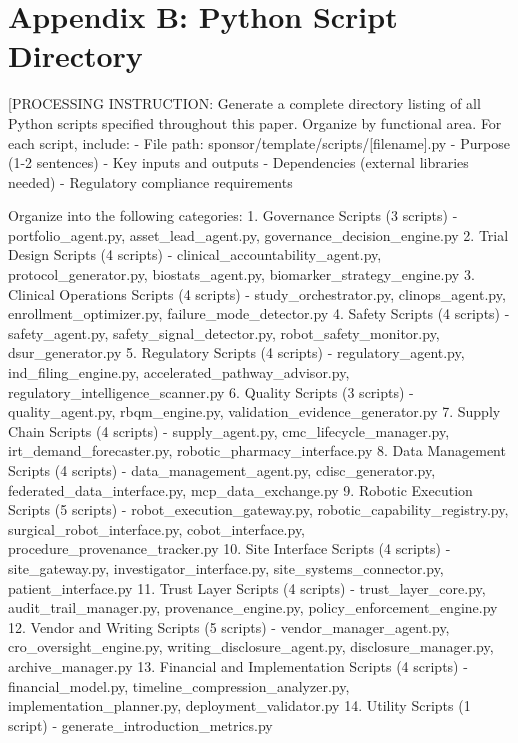 \section*{Appendix B: Python Script Directory}

[PROCESSING INSTRUCTION: Generate a complete directory listing of all Python scripts
specified throughout this paper. Organize by functional area. For each script, include:
- File path: sponsor/template/scripts/[filename].py
- Purpose (1-2 sentences)
- Key inputs and outputs
- Dependencies (external libraries needed)
- Regulatory compliance requirements

Organize into the following categories:
1. Governance Scripts (3 scripts)
   - portfolio\_agent.py, asset\_lead\_agent.py, governance\_decision\_engine.py
2. Trial Design Scripts (4 scripts)
   - clinical\_accountability\_agent.py, protocol\_generator.py, biostats\_agent.py,
     biomarker\_strategy\_engine.py
3. Clinical Operations Scripts (4 scripts)
   - study\_orchestrator.py, clinops\_agent.py, enrollment\_optimizer.py,
     failure\_mode\_detector.py
4. Safety Scripts (4 scripts)
   - safety\_agent.py, safety\_signal\_detector.py, robot\_safety\_monitor.py,
     dsur\_generator.py
5. Regulatory Scripts (4 scripts)
   - regulatory\_agent.py, ind\_filing\_engine.py, accelerated\_pathway\_advisor.py,
     regulatory\_intelligence\_scanner.py
6. Quality Scripts (3 scripts)
   - quality\_agent.py, rbqm\_engine.py, validation\_evidence\_generator.py
7. Supply Chain Scripts (4 scripts)
   - supply\_agent.py, cmc\_lifecycle\_manager.py, irt\_demand\_forecaster.py,
     robotic\_pharmacy\_interface.py
8. Data Management Scripts (4 scripts)
   - data\_management\_agent.py, cdisc\_generator.py, federated\_data\_interface.py,
     mcp\_data\_exchange.py
9. Robotic Execution Scripts (5 scripts)
   - robot\_execution\_gateway.py, robotic\_capability\_registry.py,
     surgical\_robot\_interface.py, cobot\_interface.py, procedure\_provenance\_tracker.py
10. Site Interface Scripts (4 scripts)
    - site\_gateway.py, investigator\_interface.py, site\_systems\_connector.py,
      patient\_interface.py
11. Trust Layer Scripts (4 scripts)
    - trust\_layer\_core.py, audit\_trail\_manager.py, provenance\_engine.py,
      policy\_enforcement\_engine.py
12. Vendor and Writing Scripts (5 scripts)
    - vendor\_manager\_agent.py, cro\_oversight\_engine.py, writing\_disclosure\_agent.py,
      disclosure\_manager.py, archive\_manager.py
13. Financial and Implementation Scripts (4 scripts)
    - financial\_model.py, timeline\_compression\_analyzer.py, implementation\_planner.py,
      deployment\_validator.py
14. Utility Scripts (1 script)
    - generate\_introduction\_metrics.py

